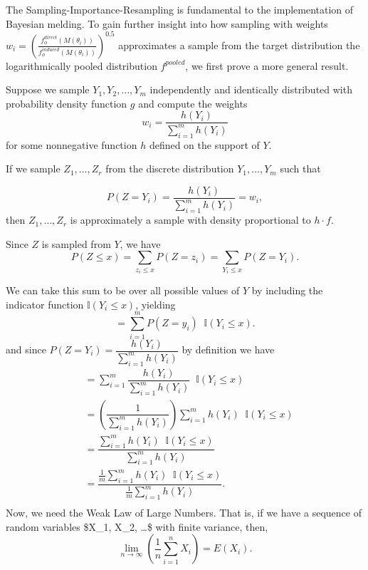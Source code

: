 \documentclass[12pt,twoside]{smiththesis}
\begin{document}
The Sampling-Importance-Resampling is fundamental to the implementation of Bayesian melding. To gain further insight into how sampling with weights \(w_i = \left( \frac{f_\phi^{direct}(M(\theta_i))}{f_\phi^{induced}(M(\theta_i))} \right)^{0.5}\)
approximates a sample from the target distribution the logarithmically pooled distribution \(f^{pooled}\), we first prove a more general result.
\begin{tcolorbox}
Suppose we sample $Y_1, Y_2, \dots, Y_m$ independently and identically distributed with probability density function  $g$ and compute the weights
\[ w_i =\dfrac{h(Y_i)}{\sum_{i=1}^mh(Y_i) }\]
for some nonnegative function $h$ defined on the support of $Y$.

If  we sample $Z_1, \dots, Z_r$ from the discrete distribution $Y_1,\dots, Y_m$ such that 

\[ P(Z = Y_i) = \dfrac{h(Y_i)}{\sum_{i=1}^mh(Y_i) } = w_i ,\]
then $Z_1, \dots, Z_r$ is approximately a sample with density proportional to $h \cdot f$.

\end{tcolorbox}
\vspace{5 mm}

Since \(Z\) is sampled from \(Y\), we have
\[ P(Z \leq x ) = \sum_{z_i \leq x} P(Z=z_i) = \sum_{Y_i \leq x} P(Z=Y_i) .\]

We can take this sum to be over all possible values of \(Y\) by including the indicator function \(\mathbb{I} (Y_i \leq x)\), yielding
\[  = \sum_{i = 1}^m P(Z=y_i)\;\;\mathbb{I} (Y_i \leq x).  \]
and since \(P(Z=Y_i) = \dfrac{h(Y_i)}{\sum_{i=1}^mh(Y_i) }\) by definition we have
\begin{align*} 
&= \sum_{i = 1}^m \dfrac{h(Y_i)}{\sum_{i=1}^mh(Y_i) }  \;\;\mathbb{I} (Y_i \leq x)   \\
&=  \left( \dfrac{1}{ {\sum_{i=1}^mh(Y_i) }} \right) {\sum_{i=1}^mh(Y_i) }  \;\;\mathbb{I} (Y_i \leq x)   \\
&=   \dfrac{ {\sum_{i=1}^mh(Y_i) }  \;\;\mathbb{I} (Y_i \leq x) }{\sum_{i=1}^mh(Y_i) } \\
&=   \dfrac{ \frac 1m {\sum_{i=1}^mh(Y_i) }  \;\;\mathbb{I} (Y_i \leq x) }{\frac 1m \sum_{i=1}^mh(Y_i) }. \\
\end{align*}
Now, we need the Weak Law of Large Numbers. That is, if we have a sequence of random variables \$X\_1, X\_2, \dots \$ with finite variance, then,
\[ \lim_{n \to \infty} \left( \frac{1}{n} \sum_{i=1}^n X_i \right)  = E(X_i). \]
\end{document}
